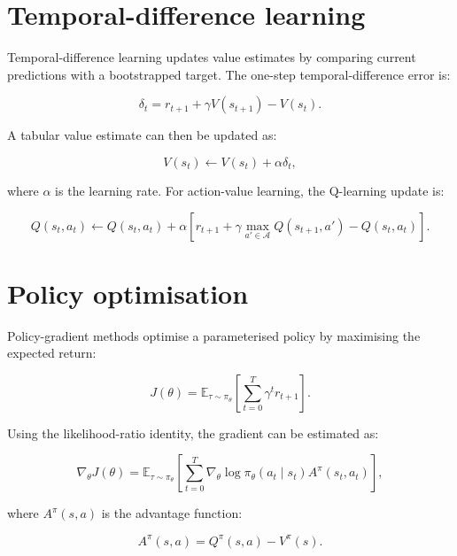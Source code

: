 \section{Temporal-difference learning}

Temporal-difference learning updates value estimates by comparing current predictions with a bootstrapped target. The one-step temporal-difference error is:

\begin{equation}
\delta_t = r_{t+1} + \gamma V(s_{t+1}) - V(s_t).
\label{eq:td-error}
\end{equation}

A tabular value estimate can then be updated as:

\begin{equation}
V(s_t) \leftarrow V(s_t) + \alpha \delta_t,
\label{eq:td-update}
\end{equation}

where $\alpha$ is the learning rate. For action-value learning, the Q-learning update is:

\begin{equation}
Q(s_t,a_t) \leftarrow Q(s_t,a_t) +
\alpha \left[
r_{t+1} + \gamma \max_{a' \in \mathcal{A}} Q(s_{t+1},a') - Q(s_t,a_t)
\right].
\label{eq:q-learning}
\end{equation}

\section{Policy optimisation}

Policy-gradient methods optimise a parameterised policy by maximising the expected return:

\begin{equation}
J(\theta) = \mathbb{E}_{\tau \sim \pi_\theta}
\left[
\sum_{t=0}^{T} \gamma^t r_{t+1}
\right].
\label{eq:policy-objective}
\end{equation}

Using the likelihood-ratio identity, the gradient can be estimated as:

\begin{equation}
\nabla_\theta J(\theta) =
\mathbb{E}_{\tau \sim \pi_\theta}
\left[
\sum_{t=0}^{T}
\nabla_\theta \log \pi_\theta(a_t \mid s_t) A^\pi(s_t,a_t)
\right],
\label{eq:policy-gradient}
\end{equation}

where $A^\pi(s,a)$ is the advantage function:

\begin{equation}
A^\pi(s,a) = Q^\pi(s,a) - V^\pi(s).
\label{eq:advantage}
\end{equation}

